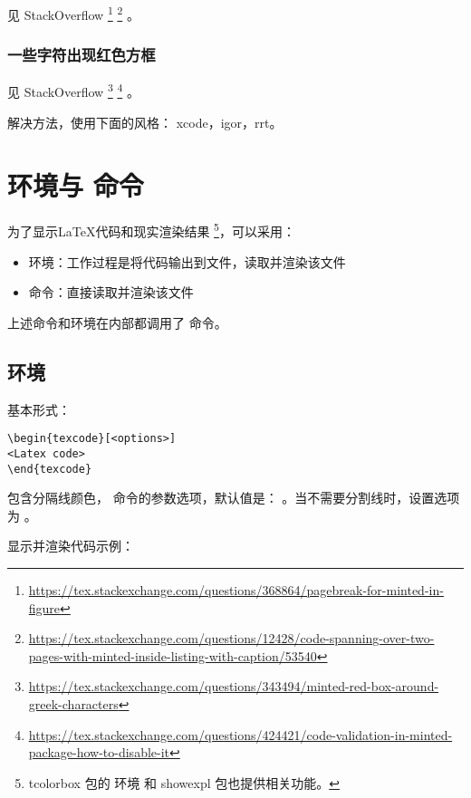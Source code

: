 见 StackOverflow
\footnote{\url{https://tex.stackexchange.com/questions/368864/pagebreak-for-minted-in-figure}}
\footnote{\url{https://tex.stackexchange.com/questions/12428/code-spanning-over-two-pages-with-minted-inside-listing-with-caption/53540}}
。

\subsubsection{一些字符出现红色方框}

见 StackOverflow
\footnote{\url{https://tex.stackexchange.com/questions/343494/minted-red-box-around-greek-characters}}
\footnote{\url{https://tex.stackexchange.com/questions/424421/code-validation-in-minted-package-how-to-disable-it}}
。

解决方法，使用下面的风格：
xcode，igor，rrt。

\section{\protect{} 环境与 \protect{} 命令}


为了显示{\LaTeX}代码和现实渲染结果
\footnote{tcolorbox 包的  环境 和 showexpl 包也提供相关功能。}，可以采用：
\begin{itemize}
  \item {} 环境：工作过程是将代码输出到文件，读取并渲染该文件
  \item {} 命令：直接读取并渲染该文件
\end{itemize}

上述命令和环境在内部都调用了  命令。

\subsection{\protect{} 环境}

基本形式：

\begin{verbatim}
\begin{texcode}[<options>]
<Latex code>
\end{texcode}
\end{verbatim}

 包含分隔线颜色， 命令的参数选项，默认值是：
\verbum{[color=teal, mint=\{\}]}。当不需要分割线时，设置选项为 \verbum{[color=\{\}]}。

显示并渲染代码示例：

